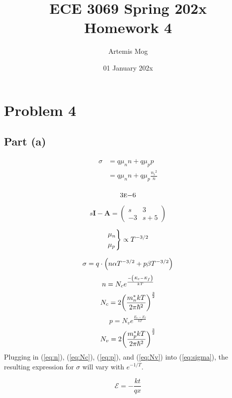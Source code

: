 \documentclass{article}
\title{ECE 3069 Spring 202x \\
       Homework 4}
\date{01 January 202x}
\author{Artemis Mog}
\DeclarePairedDelimiter\autobracket{(}{)}
\newcommand{\br}[1]{\autobracket*{#1}}
\begin{document}
\maketitle

\section*{Problem 4}
\subsection*{Part (a)}

\begin{equation*}
\begin{aligned}
\sigma &= q \mu_n n + q \mu_p p \\
&= q \mu_n n + q \mu_p \frac{{n_i}^2}{n} \\
\end{aligned}
\end{equation*}

\[ 3 \textsc{e} {-6} \]

\[
s \bm I - \bm A = \begin{pmatrix}
s & 3 \\
-3 & s+5 \end{pmatrix}
\]

\begin{equation*}
\begin{rcases}
\mu_n \\
\mu_p
\end{rcases}
\propto T^{-3/2}
\end{equation*}

\begin{equation} \label{eq:sigma}
\sigma = q \cdot \br{n \alpha T^{-3/2} + p \beta T^{-3/2}}
\end{equation}
\begin{equation} \label{eq:n}
n = N_c e^{\frac{-\br{E_c - E_f}}{kT}}
\end{equation}
\begin{equation} \label{eq:Nc}
N_c = 2\br{\frac{m_n^*kT}{2\pi\hbar^2}}^{\frac{3}{2}}
\end{equation}
\begin{equation} \label{eq:p}
p = N_v e^{\frac{E_v - E_f}{kT}}
\end{equation}
\begin{equation} \label{eq:Nv}
N_v = 2\br{\frac{m_p^*kT}{2\pi\hbar^2}}^{\frac{3}{2}}
\end{equation}
Plugging in (\ref{eq:n}), (\ref{eq:Nc}), (\ref{eq:p}), and (\ref{eq:Nv}) into
(\ref{eq:sigma}), the resulting expression for $\sigma$ will vary with
$e^{-1/T}$.

\[ \boxed{\mathcal{E} = -\frac{kt}{qx}} \]
\end{document}
